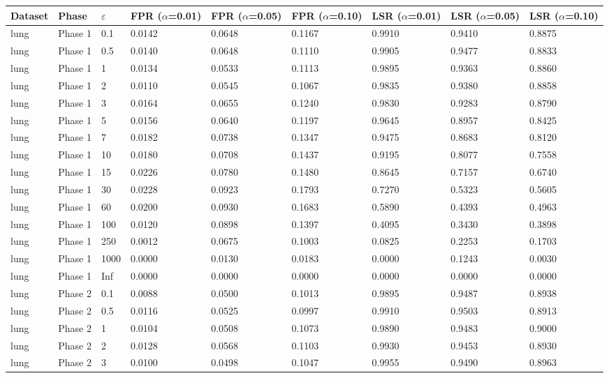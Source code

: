\begin{tabular}{lllllllll}
  \toprule
Dataset & Phase & $\varepsilon$ & FPR ($\alpha$=0.01) & FPR ($\alpha$=0.05) & FPR ($\alpha$=0.10) & LSR ($\alpha$=0.01) & LSR ($\alpha$=0.05) & LSR ($\alpha$=0.10) \\ 
  \midrule
lung & Phase 1 & 0.1 & 0.0142 & 0.0648 & 0.1167 & 0.9910 & 0.9410 & 0.8875 \\ 
  lung & Phase 1 & 0.5 & 0.0140 & 0.0648 & 0.1110 & 0.9905 & 0.9477 & 0.8833 \\ 
  lung & Phase 1 & 1 & 0.0134 & 0.0533 & 0.1113 & 0.9895 & 0.9363 & 0.8860 \\ 
  lung & Phase 1 & 2 & 0.0110 & 0.0545 & 0.1067 & 0.9835 & 0.9380 & 0.8858 \\ 
  lung & Phase 1 & 3 & 0.0164 & 0.0655 & 0.1240 & 0.9830 & 0.9283 & 0.8790 \\ 
  lung & Phase 1 & 5 & 0.0156 & 0.0640 & 0.1197 & 0.9645 & 0.8957 & 0.8425 \\ 
  lung & Phase 1 & 7 & 0.0182 & 0.0738 & 0.1347 & 0.9475 & 0.8683 & 0.8120 \\ 
  lung & Phase 1 & 10 & 0.0180 & 0.0708 & 0.1437 & 0.9195 & 0.8077 & 0.7558 \\ 
  lung & Phase 1 & 15 & 0.0226 & 0.0780 & 0.1480 & 0.8645 & 0.7157 & 0.6740 \\ 
  lung & Phase 1 & 30 & 0.0228 & 0.0923 & 0.1793 & 0.7270 & 0.5323 & 0.5605 \\ 
  lung & Phase 1 & 60 & 0.0200 & 0.0930 & 0.1683 & 0.5890 & 0.4393 & 0.4963 \\ 
  lung & Phase 1 & 100 & 0.0120 & 0.0898 & 0.1397 & 0.4095 & 0.3430 & 0.3898 \\ 
  lung & Phase 1 & 250 & 0.0012 & 0.0675 & 0.1003 & 0.0825 & 0.2253 & 0.1703 \\ 
  lung & Phase 1 & 1000 & 0.0000 & 0.0130 & 0.0183 & 0.0000 & 0.1243 & 0.0030 \\ 
  lung & Phase 1 & Inf & 0.0000 & 0.0000 & 0.0000 & 0.0000 & 0.0000 & 0.0000 \\ 
  lung & Phase 2 & 0.1 & 0.0088 & 0.0500 & 0.1013 & 0.9895 & 0.9487 & 0.8938 \\ 
  lung & Phase 2 & 0.5 & 0.0116 & 0.0525 & 0.0997 & 0.9910 & 0.9503 & 0.8913 \\ 
  lung & Phase 2 & 1 & 0.0104 & 0.0508 & 0.1073 & 0.9890 & 0.9483 & 0.9000 \\ 
  lung & Phase 2 & 2 & 0.0128 & 0.0568 & 0.1103 & 0.9930 & 0.9453 & 0.8930 \\ 
  lung & Phase 2 & 3 & 0.0100 & 0.0498 & 0.1047 & 0.9955 & 0.9490 & 0.8963 \\ 

\end{tabular}
